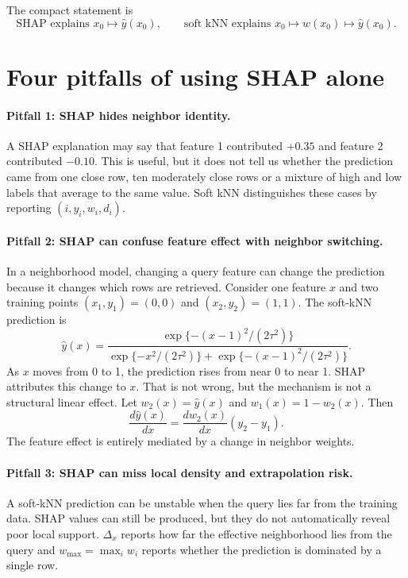 \documentclass[11pt]{article}
\newcommand{\1}{\mathbf{1}}
\begin{document}
The compact statement is
\[
\text{SHAP explains } x_0\mapsto \hat y(x_0),
\qquad
\text{soft kNN explains } x_0\mapsto w(x_0)\mapsto \hat y(x_0).
\]

\section{Four pitfalls of using SHAP alone}

\paragraph{Pitfall 1: SHAP hides neighbor identity.} A SHAP explanation may say that feature 1 contributed $+0.35$ and feature 2 contributed $-0.10$. This is useful, but it does not tell us whether the prediction came from one close row, ten moderately close rows or a mixture of high and low labels that average to the same value. Soft kNN distinguishes these cases by reporting $(i,y_i,w_i,d_i)$.

\paragraph{Pitfall 2: SHAP can confuse feature effect with neighbor switching.} In a neighborhood model, changing a query feature can change the prediction because it changes which rows are retrieved. Consider one feature $x$ and two training points $(x_1,y_1)=(0,0)$ and $(x_2,y_2)=(1,1)$. The soft-kNN prediction is
\[
\hat y(x)=\frac{\exp\{-(x-1)^2/(2\tau^2)\}}{\exp\{-x^2/(2\tau^2)\}+\exp\{-(x-1)^2/(2\tau^2)\}}.
\]
As $x$ moves from 0 to 1, the prediction rises from near 0 to near 1. SHAP attributes this change to $x$. That is not wrong, but the mechanism is not a structural linear effect. Let $w_2(x)=\hat y(x)$ and $w_1(x)=1-w_2(x)$. Then
\[
\frac{d\hat y(x)}{dx}=\frac{dw_2(x)}{dx}(y_2-y_1).
\]
The feature effect is entirely mediated by a change in neighbor weights.

\paragraph{Pitfall 3: SHAP can miss local density and extrapolation risk.} A soft-kNN prediction can be unstable when the query lies far from the training data. SHAP values can still be produced, but they do not automatically reveal poor local support. $\Delta_x$ reports how far the effective neighborhood lies from the query and $w_{\max}=\max_i w_i$ reports whether the prediction is dominated by a single row.
\end{document}
